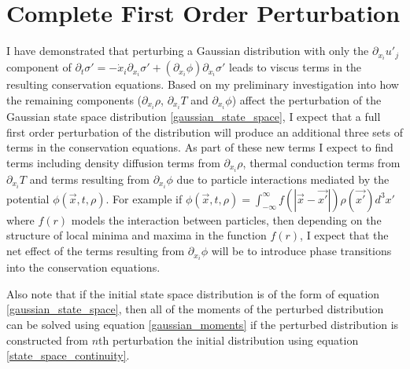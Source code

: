 \documentclass[%
 twocolumn,
 amsmath,amssymb,
 aps,
]{revtex4-1}
\begin{document}
\section{Complete First Order Perturbation}
I have demonstrated that perturbing a Gaussian distribution with only the $\partial_{x_i}u'_j$ component of $\partial_t \sigma'=-\dot{x}_i\partial_{x_i}\sigma'+\left(\partial_{x_i}\phi\right)\partial_{\dot{x}_i}\sigma'$ leads to viscus terms in the resulting conservation equations. Based on my preliminary investigation into how the remaining components ($\partial_{x_i}\rho$, $\partial_{x_i}T$ and $\partial_{x_i}\phi$) affect the perturbation of the Gaussian state space distribution \eqref{gaussian_state_space}, I expect that a full first order perturbation of the distribution will produce an additional three sets of terms in the conservation equations. As part of these new terms I expect to find terms including density diffusion terms from $\partial_{x_i}\rho$, thermal conduction terms from $\partial_{x_i}T$ and terms resulting from $\partial_{x_i}\phi$ due to particle interactions mediated by the potential $\phi\left(\vec{x}, t, \rho\right)$. For example if $\phi\left(\vec{x}, t, \rho\right)=\int_{-\infty}^{\infty}f(|\vec{x}-\vec{x'}|)\rho(\vec{x'})d^3x'$ where $f(r)$ models the interaction between particles, then depending on the structure of local minima and maxima in the function $f(r)$, I expect that the net effect of the terms resulting from $\partial_{x_i}\phi$ will be to introduce phase transitions into the conservation equations.

Also note that if the initial state space distribution is of the form of equation \eqref{gaussian_state_space}, then all of the moments of the perturbed distribution can be solved using equation \eqref{gaussian_moments} if the perturbed distribution is constructed from $n$th perturbation the initial distribution using equation \eqref{state_space_continuity}.
\end{document}
